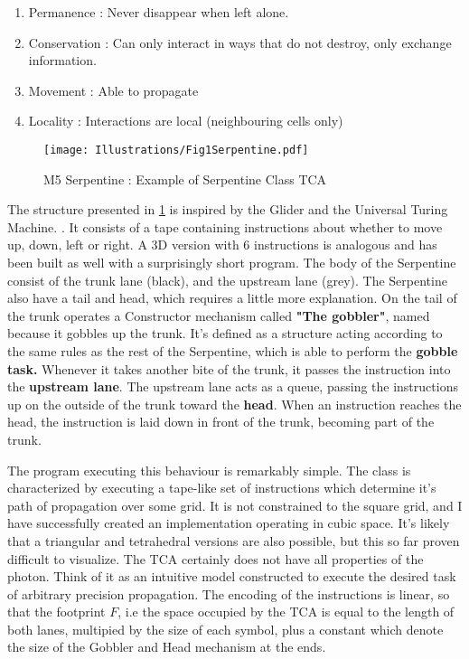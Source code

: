 \documentclass[notitlepage]{article}
\begin{document}
\begin{enumerate}
\item Permanence : Never disappear when left alone.
\item Conservation : Can only interact in ways that do not destroy, only exchange information.
\item Movement : Able to propagate
\item Locality : Interactions are local (neighbouring cells only)
\end{enumerate}

\begin{figure}[!ht]
  \centering
 \texttt{[image: Illustrations/Fig1Serpentine.pdf]}
  \caption{M5 Serpentine : Example of Serpentine Class TCA}
      \label{fig:serpentine}
\end{figure}

The structure presented in \ref{fig:serpentine} is inspired by the Glider and the Universal Turing Machine. \cite{turingMachine}. It consists of a tape containing instructions about whether to move up, down, left or right. A 3D version with 6 instructions is analogous and has been built as well with a surprisingly short program. The body of the Serpentine consist of the trunk lane (black), and the upstream lane (grey). The Serpentine also have a tail and head, which requires a little more explanation. On the tail of the trunk operates a Constructor mechanism called \textbf{"The gobbler"}, named because it gobbles up the trunk. It's defined as a structure acting according to the same rules as the rest of the Serpentine, which is able to perform the \textbf{gobble task.} Whenever it takes another bite of the trunk, it passes the instruction into the \textbf{upstream lane}. The upstream lane acts as a queue, passing the instructions  up on the outside of the trunk toward the \textbf{head}. When an instruction reaches the head, the instruction is laid down in front of the trunk, becoming part of the trunk.

The program executing this behaviour is remarkably simple. The class is characterized by executing a tape-like set of instructions which determine it's path of propagation over some grid. It is not constrained to the square grid, and I have successfully created an implementation operating in cubic space.  It's likely that a triangular and tetrahedral versions are also possible, but this so far proven difficult to visualize. The TCA certainly does not have all properties of the photon. Think of it as an intuitive model constructed to execute the desired task of arbitrary precision propagation. The encoding of the instructions is linear, so that the footprint $F$, i.e the space occupied by the TCA is equal to the length of both lanes, multipied by the size of each symbol, plus a constant which denote the size of the Gobbler and Head mechanism at the ends. 
\end{document}
